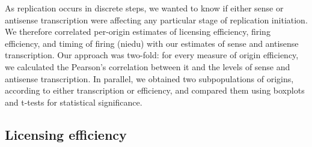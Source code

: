 As replication occurs in discrete steps, we wanted to know if either sense or antisense transcription were affecting any particular stage of replication initiation. We therefore correlated per-origin estimates of licensing efficiency, firing efficiency, and timing of firing (niedu) with our estimates of sense and antisense transcription. Our approach was two-fold: for every measure of origin efficiency, we calculated the Pearson’s correlation between it and the levels of sense and antisense transcription. In parallel, we obtained two subpopulations of origins, according to either transcription or efficiency, and compared them using boxplots and t-tests for statistical significance.

\subsection{Licensing efficiency}


